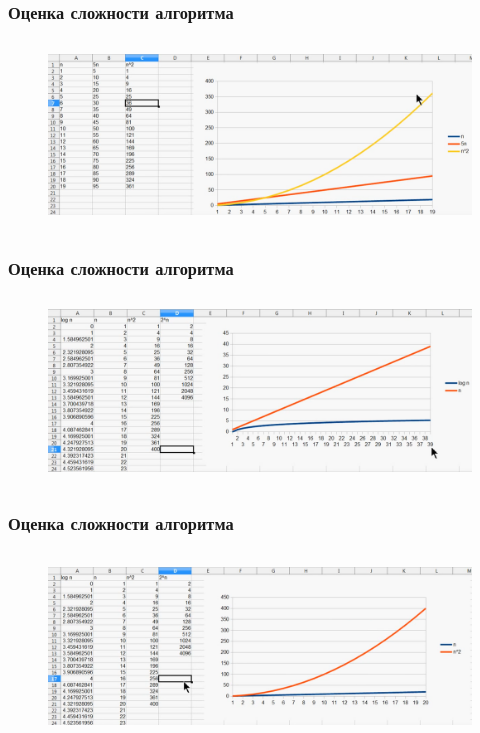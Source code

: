 \documentclass[russian, 12pt]{beamer}
\begin{document}
\begin{frame}
\frametitle{Оценка сложности алгоритма}
\begin{figure}
  \includegraphics[width=\linewidth, height=5cm]{img/scal_1.png}
\end{figure}
\end{frame}
\begin{frame}
\frametitle{Оценка сложности алгоритма}
\begin{figure}
  \includegraphics[width=\linewidth, height=5cm]{img/scal_2.png}
\end{figure}
\end{frame}
\begin{frame}
\frametitle{Оценка сложности алгоритма}
\begin{figure}
  \includegraphics[width=\linewidth, height=5cm]{img/scal_3.png}
\end{figure}
\end{frame}
\end{document}
